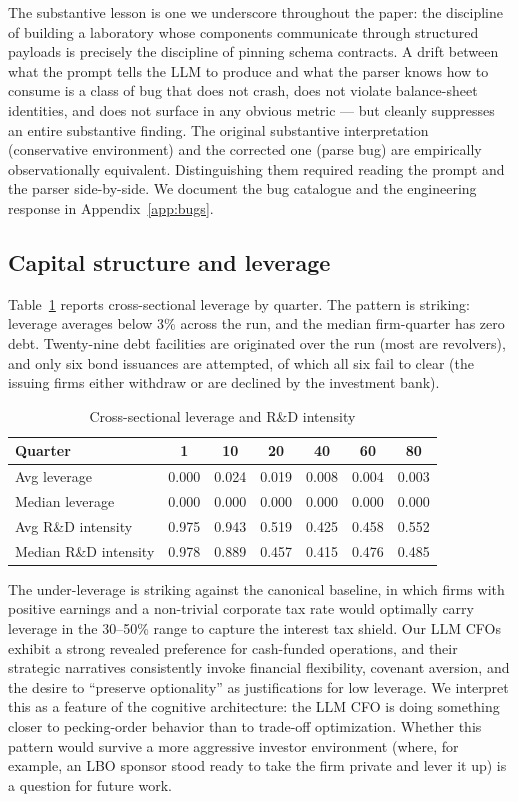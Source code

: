 \documentclass[11pt]{article}
\begin{document}
The substantive lesson is one we underscore throughout the paper: the
discipline of building a laboratory whose components communicate
through structured payloads is precisely the discipline of pinning
schema contracts. A drift between what the prompt tells the LLM to
produce and what the parser knows how to consume is a class of bug
that does not crash, does not violate balance-sheet identities, and
does not surface in any obvious metric — but cleanly suppresses an
entire substantive finding. The original substantive interpretation
(conservative environment) and the corrected one (parse bug) are
empirically observationally equivalent. Distinguishing them required
reading the prompt and the parser side-by-side. We document the bug
catalogue and the engineering response in Appendix~\ref{app:bugs}.

\subsection{Capital structure and leverage}

Table~\ref{tab:leverage} reports cross-sectional leverage by quarter.
The pattern is striking: leverage averages below 3\% across the run, and
the median firm-quarter has zero debt. Twenty-nine debt facilities are
originated over the run (most are revolvers), and only six bond
issuances are attempted, of which all six fail to clear (the issuing
firms either withdraw or are declined by the investment bank).

\begin{table}[t]\centering\small
\caption{Cross-sectional leverage and R\&D intensity}\label{tab:leverage}
\begin{tabular}{lcccccc}
\toprule
Quarter & 1 & 10 & 20 & 40 & 60 & 80 \\
\midrule
Avg leverage     & 0.000 & 0.024 & 0.019 & 0.008 & 0.004 & 0.003 \\
Median leverage  & 0.000 & 0.000 & 0.000 & 0.000 & 0.000 & 0.000 \\
Avg R\&D intensity & 0.975 & 0.943 & 0.519 & 0.425 & 0.458 & 0.552 \\
Median R\&D intensity & 0.978 & 0.889 & 0.457 & 0.415 & 0.476 & 0.485 \\
\bottomrule
\end{tabular}
\end{table}

The under-leverage is striking against the canonical
\citet{lelandtoft1996} baseline, in which firms with positive earnings
and a non-trivial corporate tax rate would optimally carry leverage in
the 30--50\% range to capture the interest tax shield. Our LLM CFOs
exhibit a strong revealed preference for cash-funded operations, and
their strategic narratives consistently invoke financial flexibility,
covenant aversion, and the desire to ``preserve optionality'' as
justifications for low leverage. We interpret this as a feature of the
cognitive architecture: the LLM CFO is doing something closer to
\citet{shyamsundermyers1999} pecking-order behavior than to trade-off
optimization. Whether this pattern would survive a more aggressive
investor environment (where, for example, an LBO sponsor stood ready to
take the firm private and lever it up) is a question for future work.
\end{document}
